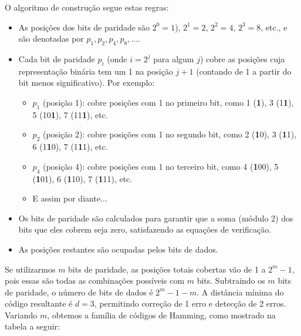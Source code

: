 O algoritmo de construção segue estas regras:
\begin{itemize}[itemsep=0pt, topsep=0pt, parsep=0pt, partopsep=0pt]
    \item As posições dos bits de paridade são $2^0 = 1$), $2^1 = 2$, $2^2 = 4$, $2^3 = 8$, etc.,
      e são denotadas por $p_1, p_2, p_4, p_8, \ldots$.
    \item Cada bit de paridade $p_i$ (onde $i = 2^j$ para algum $j$) cobre as posições
      cuja representação binária tem um 1 na posição $j+1$ (contando de 1 a partir do 
      bit menos significativo). Por exemplo:
    \begin{itemize}[itemsep=0pt, topsep=0pt, parsep=0pt, partopsep=0pt]
        \item $p_1$ (posição 1): cobre posições com 1 no primeiro bit, como 1 (\textbf{1}), 3 (1\textbf{1}), 5 (10\textbf{1}), 7 (11\textbf{1}), etc.
        \item $p_2$ (posição 2): cobre posições com 1 no segundo bit, como 2 (\textbf{1}0), 3 (\textbf{1}1), 6 (1\textbf{1}0), 7 (1\textbf{1}1), etc.
        \item $p_4$ (posição 4): cobre posições com 1 no terceiro bit, como 4 (\textbf{1}00), 5 (\textbf{1}01), 6 (\textbf{1}10), 7 (\textbf{1}11), etc.
        \item E assim por diante...
    \end{itemize}
    \item Os bits de paridade são calculados para garantir que a soma (módulo 2) 
      dos bits que eles cobrem seja zero, satisfazendo as equações de verificação.
    \item As posições restantes são ocupadas pelos bits de dados.
\end{itemize}

Se utilizarmos $m$ bits de paridade, as posições totais cobertas vão de 1 a $2^m - 1$, 
pois essas são todas as combinações possíveis com $m$ bits. 
Subtraindo os $m$ bits de paridade, o número de bits de dados é $2^m - 1 - m$. 
A distância mínima do código resultante é $d = 3$, 
permitindo correção de 1 erro e detecção de 2 erros. 
Variando $m$, obtemos a família de códigos de Hamming, como mostrado na tabela a seguir:


